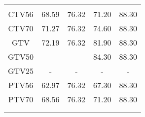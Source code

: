 \begin{sidewaystable}[p]
{\begin{tabular}{ccccc}
 \bottomrule\\
CTV56 & 68.59 & 76.32 & 71.20 & 88.30 \\
CTV70 & 71.27 & 76.32 & 74.60 & 88.30 \\
GTV & 72.19 & 76.32 & 81.90 & 88.30 \\
GTV50 & - & - & 84.30 & 88.30 \\
GTV25 & - & - & - & - \\
PTV56 & 62.97 & 76.32 & 67.30 & 88.30 \\
PTV70 & 68.56 & 76.32 & 71.20 & 88.30 \\\\
 \bottomrule\\
 \end{tabular}
}
\end{sidewaystable}


